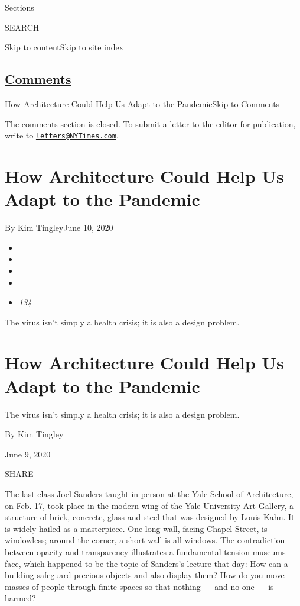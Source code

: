 Sections

SEARCH

\protect\hyperlink{site-content}{Skip to
content}\protect\hyperlink{site-index}{Skip to site index}

\hypertarget{comments}{%
\subsection{\texorpdfstring{\protect\hyperlink{commentsContainer}{Comments}}{Comments}}\label{comments}}

\href{}{How Architecture Could Help Us Adapt to the
Pandemic}\href{}{Skip to Comments}

The comments section is closed. To submit a letter to the editor for
publication, write to
\href{mailto:letters@NYTimes.com}{\nolinkurl{letters@NYTimes.com}}.

\hypertarget{how-architecture-could-help-us-adapt-to-the-pandemic}{%
\section{How Architecture Could Help Us Adapt to the
Pandemic}\label{how-architecture-could-help-us-adapt-to-the-pandemic}}

By Kim TingleyJune 10, 2020

\begin{itemize}
\item
\item
\item
\item
\item
  \emph{134}
\end{itemize}

The virus isn't simply a health crisis; it is also a design problem.

\hypertarget{how-architecture-could-help-us-adapt-to-the-pandemic-1}{%
\section{How Architecture Could Help Us Adapt to the
Pandemic}\label{how-architecture-could-help-us-adapt-to-the-pandemic-1}}

The virus isn't simply a health crisis; it is also a design problem.

By Kim Tingley

June 9, 2020

SHARE

The last class Joel Sanders taught in person at the Yale School of
Architecture, on Feb. 17, took place in the modern wing of the Yale
University Art Gallery, a structure of brick, concrete, glass and steel
that was designed by Louis Kahn. It is widely hailed as a masterpiece.
One long wall, facing Chapel Street, is windowless; around the corner, a
short wall is all windows. The contradiction between opacity and
transparency illustrates a fundamental tension museums face, which
happened to be the topic of Sanders's lecture that day: How can a
building safeguard precious objects and also display them? How do you
move masses of people through finite spaces so that nothing --- and no
one --- is harmed?

